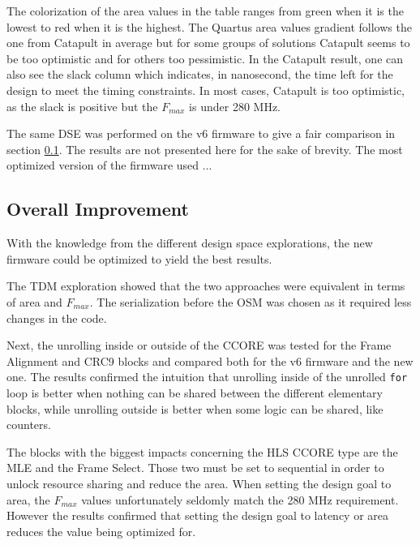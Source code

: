 \begin{itemize}
The colorization of the area values in the table ranges from green when it is the lowest to red when it is the highest. The Quartus area values gradient follows the one from Catapult in average but for some groups of solutions Catapult seems to be too optimistic and for others too pessimistic. In the Catapult result, one can also see the slack column which indicates, in nanosecond, the time left for the design to meet the timing constraints. In most cases, Catapult is too optimistic, as the slack is positive but the \(F_{max}\) is under 280 MHz.




The same DSE was performed on the v6 firmware to give a fair comparison in section \ref{sec:overall-improvement}. The results are not presented here for the sake of brevity. The most optimized version of the firmware used ...


\subsection{Overall Improvement}\label{sec:overall-improvement}

With the knowledge from the different design space explorations, the new firmware could be optimized to yield the best results.

The TDM exploration showed that the two approaches were equivalent in terms of area and \(F_{max}\). The serialization before the OSM was chosen as it required less changes in the code.

Next, the unrolling inside or outside of the CCORE was tested for the Frame Alignment and CRC9 blocks and compared both for the v6 firmware and the new one. The results confirmed the intuition that unrolling inside of the unrolled \verb|for| loop is better when nothing can be shared between the different elementary blocks, while unrolling outside is better when some logic can be shared, like counters.

The blocks with the biggest impacts concerning the HLS CCORE type are the MLE and the Frame Select. Those two must be set to sequential in order to unlock resource sharing and reduce the area. When setting the design goal to area, the \(F_{max}\) values unfortunately seldomly match the 280 MHz requirement. However the results confirmed that setting the design goal to latency or area reduces the value being optimized for.


\end{itemize}
